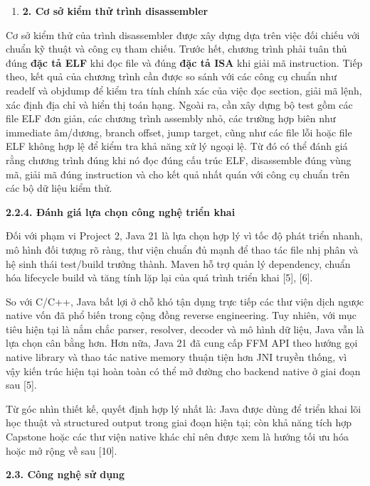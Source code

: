 \documentclass[
]{article}
\begin{document}
\begin{enumerate}
\def\labelenumi{\arabic{enumi}.}
\setcounter{enumi}{1}
\item
  \textbf{2. Cơ sở kiểm thử trình disassembler}
\end{enumerate}

Cơ sở kiểm thử của trình disassembler được xây dựng dựa trên việc đối
chiếu với chuẩn kỹ thuật và công cụ tham chiếu. Trước hết, chương trình
phải tuân thủ đúng \textbf{đặc tả ELF} khi đọc file và đúng \textbf{đặc
tả ISA} khi giải mã instruction. Tiếp theo, kết quả của chương trình cần
được so sánh với các công cụ chuẩn như readelf và objdump để kiểm tra
tính chính xác của việc đọc section, giải mã lệnh, xác định địa chỉ và
hiển thị toán hạng. Ngoài ra, cần xây dựng bộ test gồm các file ELF đơn
giản, các chương trình assembly nhỏ, các trường hợp biên như immediate
âm/dương, branch offset, jump target, cũng như các file lỗi hoặc file
ELF không hợp lệ để kiểm tra khả năng xử lý ngoại lệ. Từ đó có thể đánh
giá rằng chương trình đúng khi nó đọc đúng cấu trúc ELF, disassemble
đúng vùng mã, giải mã đúng instruction và cho kết quả nhất quán với công
cụ chuẩn trên các bộ dữ liệu kiểm thử.

\textbf{2.2.4. Đánh giá lựa chọn công nghệ triển khai}

Đối với phạm vi Project 2, Java 21 là lựa chọn hợp lý vì tốc độ phát
triển nhanh, mô hình đối tượng rõ ràng, thư viện chuẩn đủ mạnh để thao
tác file nhị phân và hệ sinh thái test/build trưởng thành. Maven hỗ trợ
quản lý dependency, chuẩn hóa lifecycle build và tăng tính lặp lại của
quá trình triển khai {[}5{]}, {[}6{]}.

So với C/C++, Java bất lợi ở chỗ khó tận dụng trực tiếp các thư viện
dịch ngược native vốn đã phổ biến trong cộng đồng reverse engineering.
Tuy nhiên, với mục tiêu hiện tại là nắm chắc parser, resolver, decoder
và mô hình dữ liệu, Java vẫn là lựa chọn cân bằng hơn. Hơn nữa, Java 21
đã cung cấp FFM API theo hướng gọi native library và thao tác native
memory thuận tiện hơn JNI truyền thống, vì vậy kiến trúc hiện tại hoàn
toàn có thể mở đường cho backend native ở giai đoạn sau {[}5{]}.

Từ góc nhìn thiết kế, quyết định hợp lý nhất là: Java được dùng để triển
khai lõi học thuật và structured output trong giai đoạn hiện tại; còn
khả năng tích hợp Capstone hoặc các thư viện native khác chỉ nên được
xem là hướng tối ưu hóa hoặc mở rộng về sau {[}10{]}.

\textbf{2.3. Công nghệ sử dụng}
\end{document}

